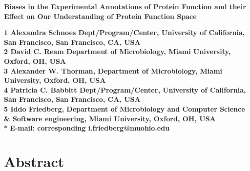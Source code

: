 \documentclass[12pt]{article}
\date{}
\begin{document}
\begin{flushleft}
{\Large
\textbf{Biases in the Experimental Annotations of Protein Function and their Effect on Our
Understanding of Protein Function Space}
}
\\
\author{Alexandra Schnoes$^1$%
         David C. Ream$^2$%
      \and
         Alexander Thorman$^2$%
      \and
         Patricia Babbitt$^1$%
       \and 
        Iddo Friedberg\correspondingauthor$^{2,3}$%
      }
      

\bf{1} Alexandra Schnoes Dept/Program/Center, University of California, San Francisco, San Francisco, CA,
USA
\\
\bf{2} David C. Ream Department of Microbiology, Miami University, Oxford, OH, USA
\\
\bf{3} Alexander W. Thorman, Department of Microbiology, Miami University, Oxford, OH, USA
\\
\bf{4} Patricia C. Babbitt Dept/Program/Center, University of California, San Francisco, San Francisco, CA,
USA
\\
\bf{5} Iddo Friedberg, Department of Microbiology and Computer Science \& Software engineering, Miami University, Oxford, OH, USA
\\
$\ast$ E-mail: corresponding i.friedberg@muohio.edu
\end{flushleft}

\linenumbers %
\section*{Abstract}
\end{document}
